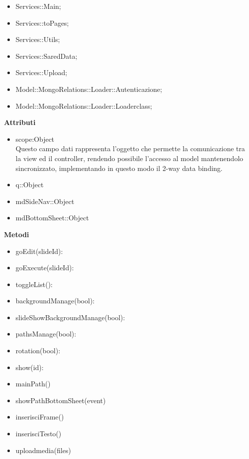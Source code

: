{{\begin{itemize}
\begin{itemize}
													\item ConcreteEditContentCommand; [[[[[[[[[[[[[[[[ESISTE????]]]]]]]]]]]]]]]]
													\item Invoker;
					\end{itemize}
						\item Services::Main;
						\item Services::toPages;
						\item Services::Utils;
						\item Services::SaredData;
						\item Services::Upload;
						\item Model::MongoRelations::Loader::Autenticazione;
						\item Model::MongoRelations::Loader::Loaderclass;
					\end{itemize}
					\textbf{Attributi}\\
					\begin{itemize}
					\item scope:Object\\
					Questo campo dati rappresenta l’oggetto che permette la comunicazione tra la view ed il controller, rendendo possibile l’accesso al model mantenendolo sincronizzato, implementando in questo modo il 2-way data binding.
					\item q::Object\\
					\item mdSideNav::Object
					\item mdBottomSheet::Object
				    \end{itemize}
					\textbf{Metodi}
					\begin{itemize}
					\item goEdit(slideId):
					\item goExecute(slideId):
					\item toggleList():
					\item backgroundManage(bool):
					\item slideShowBackgroundManage(bool):
					\item pathsManage(bool):
					\item rotation(bool):
					\item show(id):
					\item mainPath()
					\item showPathBottomSheet(event)
					\item inserisciFrame()
					\item inserisciTesto()
					\item uploadmedia(files)

\end{itemize}}}
